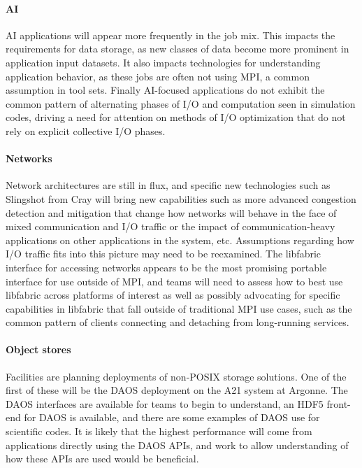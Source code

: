 \paragraph{AI} AI applications will appear more frequently in the job mix. This impacts the requirements for data storage, as new classes of data become more prominent in application input datasets. It also impacts technologies for understanding application behavior, as these jobs are often not using MPI, a common assumption in tool sets. Finally AI-focused applications do not exhibit the common pattern of alternating phases of I/O and computation seen in simulation codes, driving a need for attention on methods of I/O optimization that do not rely on explicit collective I/O phases.

\paragraph{Networks} Network architectures are still in flux, and specific new technologies such as Slingshot from Cray will bring new capabilities such as more advanced congestion detection and mitigation that change how networks will behave in the face of mixed communication and I/O traffic or the impact of communication-heavy applications on other applications in the system, etc.  Assumptions regarding how I/O traffic fits into this picture may need to be reexamined. The libfabric interface for accessing networks appears to be the most promising portable interface for use outside of MPI, and teams will need to assess how to best use libfabric across platforms of interest as well as possibly advocating for specific capabilities in libfabric that fall outside of traditional MPI use cases, such as the common pattern of clients connecting and detaching from long-running services.

\paragraph{Object stores} Facilities are planning deployments of non-POSIX storage solutions. One of the first of these will be the DAOS deployment on the A21 system at Argonne. The DAOS interfaces are available for teams to begin to understand, an HDF5 front-end for DAOS is available, and there are some examples of DAOS use for scientific codes. It is likely that the highest performance will come from applications directly using the DAOS APIs, and work to allow understanding of how these APIs are used would be beneficial.

